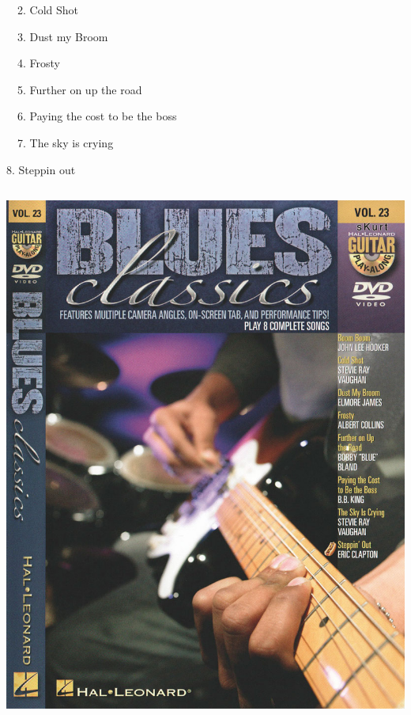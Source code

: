 \documentclass[a4paper]{book}
\begin{document}
\ \  2. Cold Shot

\ \  3. Dust my Broom

\ \  4. Frosty

\ \  5. Further on up the road

\ \  6. Paying the cost to be the boss

\ \  7. The sky is crying

8. Steppin{\textquotesingle} out






\begin{center}
\includegraphics[width=13.968cm,height=17.791cm]{lebluessupportsmethodes-img67.jpg}
\end{center}









\clearpage
\end{document}
